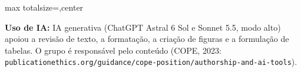 \documentclass[12pt]{article}
\begin{document}
\begin{adjustbox}{max totalsize={\textwidth}{\textheight},center}
{%
\vspace{2mm}
{\fontsize{10.5}{13}\selectfont\color{ctxText}\textbf{Uso de IA:} IA generativa (ChatGPT Astral 6 Sol e Sonnet 5.5, modo alto) apoiou a revisão de texto, a formatação, a criação de figuras e a formulação de tabelas. O grupo é responsável pelo conteúdo (COPE, 2023: \texttt{publicationethics.org/guidance/cope-position/authorship-and-ai-tools}).\par}

}%
\end{adjustbox}
\end{document}
